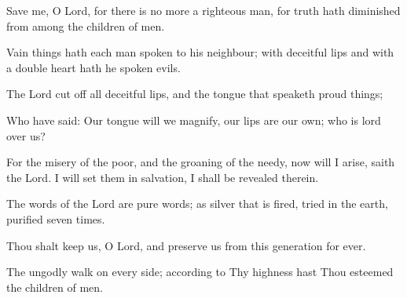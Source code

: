 Save me, O Lord, for there is no more a righteous man, for truth hath diminished from among the children of men.

Vain things hath each man spoken to his neighbour; with deceitful lips and with a double heart hath he spoken evils.

The Lord cut off all deceitful lips, and the tongue that speaketh proud things;

Who have said: Our tongue will we magnify, our lips are our own; who is lord over us?

For the misery of the poor, and the groaning of the needy, now will I arise, saith the Lord. I will set them in salvation, I shall be revealed therein.

The words of the Lord are pure words; as silver that is fired, tried in the earth, purified seven times.

Thou shalt keep us, O Lord, and preserve us from this generation for ever.

The ungodly walk on every side; according to Thy highness hast Thou esteemed the children of men.
